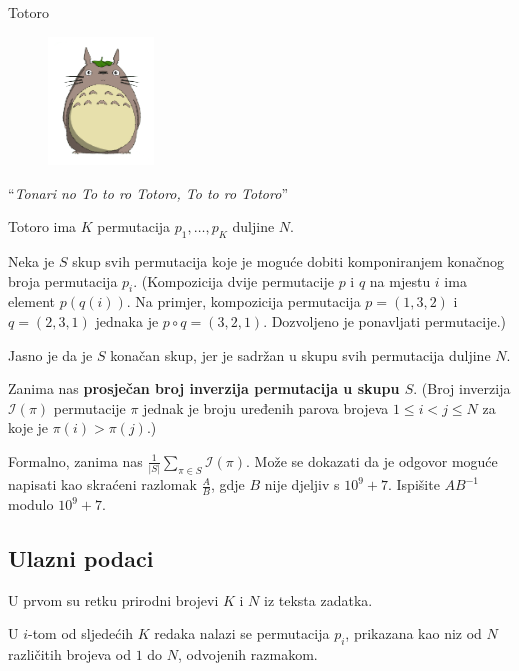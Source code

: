 \begin{statement}[
  problempoints=100,
  timelimit=1 sekunda,
  memorylimit=512 MiB,
]{Totoro}

\setlength\intextsep{-0.1cm}
\begin{figure}
\centering
\includegraphics[width=0.25\textwidth]{img/totoro.png}
\end{figure}

``\textit{Tonari no To to ro Totoro, To to ro Totoro}'' 

Totoro ima $K$ permutacija $p_1, \ldots, p_K$ duljine $N$.

Neka je $S$ skup svih permutacija koje je moguće
dobiti komponiranjem konačnog broja permutacija $p_i$. 
(Kompozicija dvije permutacije $p$ i $q$ 
na mjestu $i$ ima element $p(q(i))$. Na primjer, 
kompozicija permutacija $p = (1, 3, 2)$
i $q = (2, 3, 1)$ jednaka je $p \circ q = (3, 2, 1)$. 
Dozvoljeno je ponavljati permutacije.)

Jasno je da je $S$ konačan skup, jer je sadržan u skupu svih
permutacija duljine $N$.

Zanima nas \textbf{prosječan broj inverzija permutacija u skupu $S$}.
(Broj inverzija $\mathcal{I}(\pi)$ permutacije $\pi$ 
jednak je broju uređenih parova
brojeva $1 \le i < j \le N$ za koje je $\pi(i) > \pi(j)$.)

Formalno, zanima nas $\frac{1}{|S|} \sum_{\pi \in S} \mathcal{I} (\pi)$.
Može se dokazati da je odgovor moguće napisati
kao skraćeni razlomak $\frac{A}{B}$, gdje $B$ nije djeljiv s $10^9 + 7$. 
Ispišite $AB^{-1}$ modulo $10^9 + 7$.

\subsection*{Ulazni podaci}
U prvom su retku prirodni brojevi $K$ i $N$ iz teksta zadatka.

U $i$-tom od sljedećih $K$ redaka nalazi se permutacija $p_i$, 
prikazana kao niz od $N$ različitih brojeva od $1$ do $N$, odvojenih razmakom.


\end{statement}
